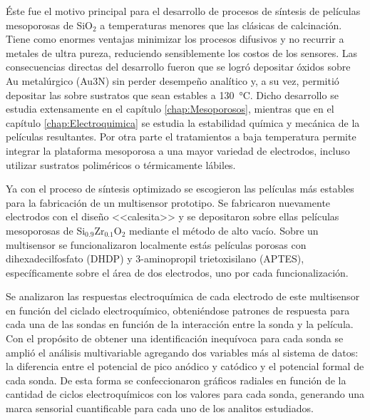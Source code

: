 	Éste fue el motivo principal para el desarrollo de procesos de síntesis de películas mesoporosas de SiO$_2$ a temperaturas menores que las clásicas de calcinación. Tiene como enormes ventajas minimizar los procesos difusivos y no recurrir a metales de ultra pureza, reduciendo sensiblemente los costos de los sensores. Las consecuencias directas del desarrollo fueron que se logró depositar óxidos sobre Au metalúrgico (Au3N) sin perder desempeño analítico y, a su vez, permitió depositar las \pdm\space sobre sustratos que sean estables a \SI{130}{\celsius}. Dicho desarrollo se estudia extensamente en el capítulo \ref{chap:Mesoporosos}, mientras que en el capítulo \ref{chap:Electroquimica} se estudia la estabilidad química y mecánica de la películas resultantes. Por otra parte el tratamientos a baja temperatura permite integrar la plataforma mesoporosa a una mayor variedad de electrodos, incluso utilizar sustratos poliméricos o térmicamente lábiles.

	Ya con el proceso de síntesis optimizado se escogieron las películas más estables para la fabricación de un multisensor prototipo. Se fabricaron nuevamente electrodos con el diseño <<calesita>> y se depositaron sobre ellas películas mesoporosas de Si$_{0.9}$Zr$_{0.1}$O$_2$ mediante el método de alto vacío. Sobre un multisensor se funcionalizaron localmente estás películas porosas con dihexadecilfosfato (DHDP) y 3-aminopropil trietoxisilano (APTES), específicamente sobre el área de dos electrodos, uno por cada funcionalización.
	
	Se analizaron las respuestas electroquímica de cada electrodo de este multisensor en función del ciclado electroquímico, obteniéndose patrones de respuesta para cada una de las sondas en función de la interacción entre la sonda y la película. Con el propósito de obtener una identificación inequívoca para cada sonda se amplió el análisis multivariable agregando dos variables más al sistema de datos: la diferencia entre el potencial de pico anódico y catódico y el potencial formal de cada sonda. De esta forma se confeccionaron gráficos radiales en función de la cantidad de ciclos electroquímicos con los valores para cada sonda, generando una marca sensorial cuantificable para cada uno de los analitos estudiados.





	